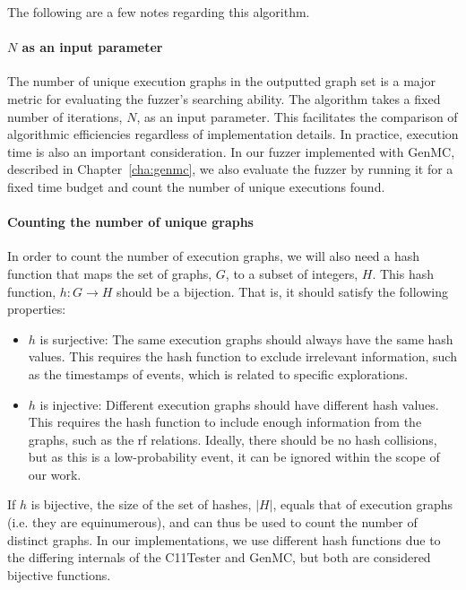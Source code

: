 The following are a few notes regarding this algorithm.

\paragraph*{$N$ as an input parameter} The number of unique execution graphs in the outputted graph set is a major metric for evaluating the fuzzer's searching ability. The algorithm takes a fixed number of iterations, $N$, as an input parameter. This facilitates the comparison of algorithmic efficiencies regardless of implementation details. In practice, execution time is also an important consideration. In our fuzzer implemented with GenMC, described in Chapter~\ref{cha:genmc}, we also evaluate the fuzzer by running it for a fixed time budget and count the number of unique executions found.

\paragraph*{Counting the number of unique graphs} In order to count the number of execution graphs, we will also need a hash function that maps the set of graphs, $G$, to a subset of integers, $H$. This hash function, $h: G \to H$ should be a bijection. That is, it should satisfy the following properties:
\begin{itemize}
    \item $h$ is surjective: The same execution graphs should always have the same hash values. This requires the hash function to exclude irrelevant information, such as the timestamps of events, which is related to specific explorations. 
	\item $h$ is injective: Different execution graphs should have different hash values. This requires the hash function to include enough information from the graphs, such as the rf relations. Ideally, there should be no hash collisions, but as this is a low-probability event, it can be ignored within the scope of our work.
\end{itemize}

If $h$ is bijective, the size of the set of hashes, $|H|$, equals that of execution graphs (i.e. they are equinumerous), and can thus be used to count the number of distinct graphs. In our implementations, we use different hash functions due to the differing internals of the C11Tester and GenMC, but both are considered bijective functions.


